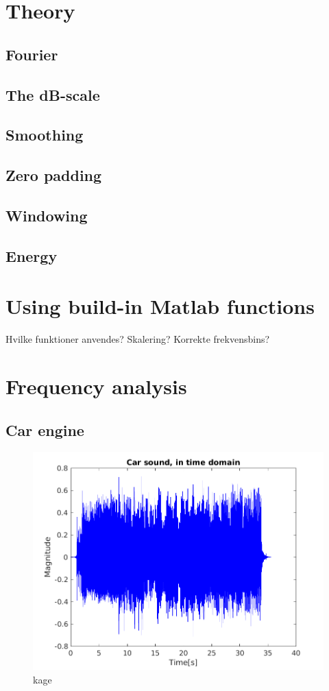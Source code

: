 \section{Theory}
\subsection{Fourier}

\subsection{The dB-scale}

\subsection{Smoothing}

\subsection{Zero padding}

\subsection{Windowing}

\subsection{Energy}

\section{Using build-in Matlab functions}
Hvilke funktioner anvendes?
Skalering?
Korrekte frekvensbins?

\section{Frequency analysis}
\subsection{Car engine}

\begin{figure}
	\includegraphics[width=\textwidth]{code/Car_figure1.png}
	\caption{kage}
\end{figure}

